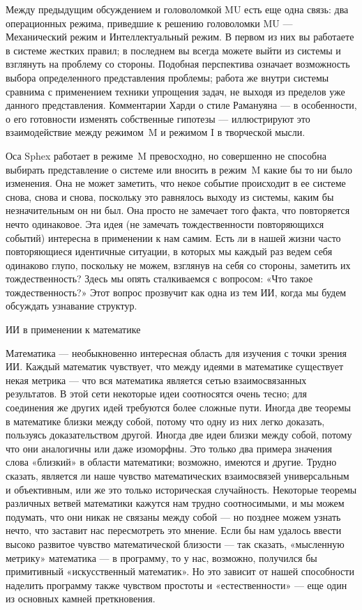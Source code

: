 Между предыдущим обсуждением и головоломкой MU есть еще одна связь: два операционных режима, приведшие к решению головоломки MU --- Механический режим и Интеллектуальный режим. В первом из них вы работаете в системе жестких правил; в последнем вы всегда можете выйти из системы и взглянуть на проблему со стороны. Подобная перспектива означает возможность выбора определенного представления проблемы; работа же внутри системы сравнима с применением техники упрощения задач, не выходя из пределов уже данного представления. Комментарии Харди о стиле Рамануяна --- в особенности, о его готовности изменять собственные гипотезы --- иллюстрируют это взаимодействие между режимом~M и режимом I в творческой мысли.

Оса Sphex работает в режиме~M превосходно, но совершенно не способна выбирать представление о системе или вносить в режим~M какие бы то ни было изменения. Она не может заметить, что некое событие происходит в ее системе снова, снова и снова, поскольку это равнялось выходу из системы, каким бы незначительным он ни был. Она просто не замечает того факта, что повторяется нечто одинаковое. Эта идея (не замечать тождественности повторяющихся событий) интересна в применении к нам самим. Есть ли в нашей жизни часто повторяющиеся идентичные ситуации, в которых мы каждый раз ведем себя одинаково глупо, поскольку не можем, взглянув на себя со стороны, заметить их тождественность? Здесь мы опять сталкиваемся с вопросом: «Что такое тождественность?» Этот вопрос прозвучит как одна из тем ИИ, когда мы будем обсуждать узнавание структур.

ИИ в применении к математике

Математика --- необыкновенно интересная область для изучения с точки зрения ИИ. Каждый математик чувствует, что между идеями в математике существует некая метрика --- что вся математика является сетью взаимосвязанных результатов. В этой сети некоторые идеи соотносятся очень тесно; для соединения же других идей требуются более сложные пути. Иногда две теоремы в математике близки между собой, потому что одну из них легко доказать, пользуясь доказательством другой. Иногда две идеи близки между собой, потому что они аналогичны или даже изоморфны. Это только два примера значения слова «близкий» в области математики; возможно, имеются и другие. Трудно сказать, является ли наше чувство математических взаимосвязей универсальным и объективным, или же это только историческая случайность. Некоторые теоремы различных ветвей математики кажутся нам трудно соотносимыми, и мы можем подумать, что они никак не связаны между собой --- но позднее можем узнать нечто, что заставит нас пересмотреть это мнение. Если бы нам удалось ввести высоко развитое чувство математической близости --- так сказать, «мысленную метрику» математика --- в программу, то у нас, возможно, получился бы примитивный «искусственный математик». Но это зависит от нашей способности наделить программу также чувством простоты и «естественности» --- еще один из основных камней преткновения.

